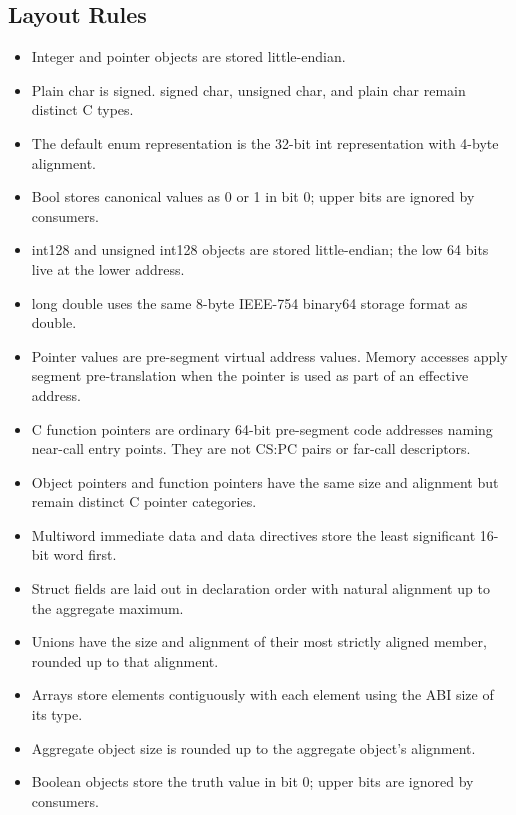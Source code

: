 \documentclass[10pt,twoside]{article}
\begin{document}
\subsection{Layout Rules}
\begin{itemize}
\item Integer and pointer objects are stored little-endian.
\item Plain char is signed. signed char, unsigned char, and plain char remain distinct C types.
\item The default enum representation is the 32-bit int representation with 4-byte alignment.
\item  Bool stores canonical values as 0 or 1 in bit 0; upper bits are ignored by consumers.
\item   int128 and unsigned   int128 objects are stored little-endian; the low 64 bits live at the lower address.
\item long double uses the same 8-byte IEEE-754 binary64 storage format as double.
\item Pointer values are pre-segment virtual address values. Memory accesses apply segment pre-translation when the pointer is used as part of an effective address.
\item C function pointers are ordinary 64-bit pre-segment code addresses naming near-call entry points. They are not CS:PC pairs or far-call descriptors.
\item Object pointers and function pointers have the same size and alignment but remain distinct C pointer categories.
\item Multiword immediate data and data directives store the least significant 16-bit word first.
\item Struct fields are laid out in declaration order with natural alignment up to the aggregate maximum.
\item Unions have the size and alignment of their most strictly aligned member, rounded up to that alignment.
\item Arrays store elements contiguously with each element using the ABI size of its type.
\item Aggregate object size is rounded up to the aggregate object's alignment.
\item Boolean objects store the truth value in bit 0; upper bits are ignored by consumers.
\end{itemize}

\clearpage
\end{document}
